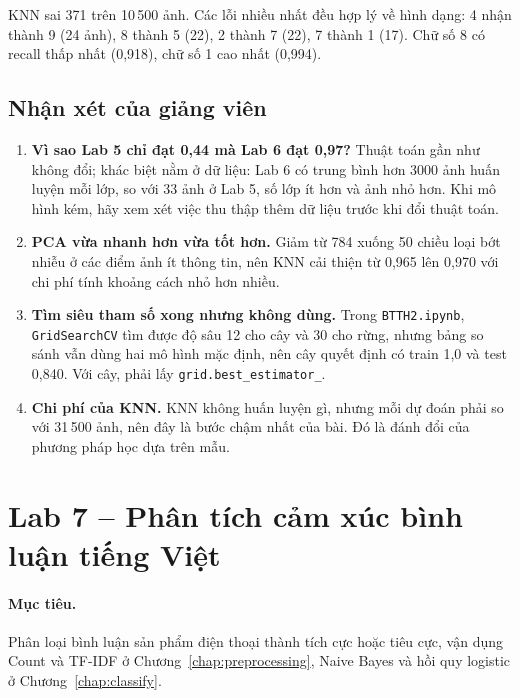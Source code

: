 
KNN sai 371 trên 10\,500 ảnh. Các lỗi nhiều nhất đều hợp lý về hình dạng: 4 nhận thành 9 (24 ảnh), 8 thành 5 (22), 2 thành 7 (22), 7 thành 1 (17). Chữ số 8 có recall thấp nhất (0,918), chữ số 1 cao nhất (0,994).

\subsection{Nhận xét của giảng viên}

\begin{enumerate}
    \item \textbf{Vì sao Lab 5 chỉ đạt 0,44 mà Lab 6 đạt 0,97?} Thuật toán gần như không đổi; khác biệt nằm ở dữ liệu: Lab 6 có trung bình hơn 3000 ảnh huấn luyện mỗi lớp, so với 33 ảnh ở Lab 5, số lớp ít hơn và ảnh nhỏ hơn. Khi mô hình kém, hãy xem xét việc thu thập thêm dữ liệu trước khi đổi thuật toán.
    \item \textbf{PCA vừa nhanh hơn vừa tốt hơn.} Giảm từ 784 xuống 50 chiều loại bớt nhiễu ở các điểm ảnh ít thông tin, nên KNN cải thiện từ 0,965 lên 0,970 với chi phí tính khoảng cách nhỏ hơn nhiều.
    \item \textbf{Tìm siêu tham số xong nhưng không dùng.} Trong \texttt{BTTH2.ipynb}, \texttt{GridSearchCV} tìm được độ sâu 12 cho cây và 30 cho rừng, nhưng bảng so sánh vẫn dùng hai mô hình mặc định, nên cây quyết định có train 1,0 và test 0,840. Với cây, phải lấy \texttt{grid.best\_estimator\_}.
    \item \textbf{Chi phí của KNN.} KNN không huấn luyện gì, nhưng mỗi dự đoán phải so với 31\,500 ảnh, nên đây là bước chậm nhất của bài. Đó là đánh đổi của phương pháp học dựa trên mẫu.
\end{enumerate}

\section{Lab 7 -- Phân tích cảm xúc bình luận tiếng Việt}
\label{sec:lab-sentiment}

\paragraph{Mục tiêu.} Phân loại bình luận sản phẩm điện thoại thành tích cực hoặc tiêu cực, vận dụng Count và TF-IDF ở Chương~\ref{chap:preprocessing}, Naive Bayes và hồi quy logistic ở Chương~\ref{chap:classify}.

